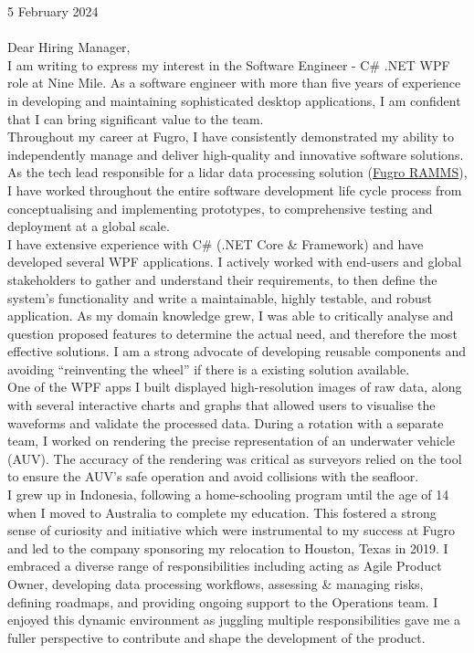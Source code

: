 \vspace{30pt}

5 February 2024 \\ \\

Dear Hiring Manager, \\

I am writing to express my interest in the Software Engineer - C\# .NET WPF role at Nine Mile. As a software engineer with more than five years of experience in developing and maintaining sophisticated desktop applications, I am confident that I can bring significant value to the team. \\

Throughout my career at Fugro, I have consistently demonstrated my ability to independently manage and deliver high-quality and innovative software solutions. As the tech lead responsible for a lidar data processing solution (\href{https://www.youtube.com/watch?v=f65bdm4tous}{\underline{Fugro RAMMS}}), I have worked throughout the entire software development life cycle process from conceptualising and implementing prototypes, to comprehensive testing and deployment at a global scale. \\

I have extensive experience with C\# (.NET Core \& Framework) and have developed several WPF applications. I actively worked with end-users and global stakeholders to gather and understand their requirements, to then define the system's functionality and write a maintainable, highly testable, and robust application. As my domain knowledge grew, I was able to critically analyse and question proposed features to determine the actual need, and therefore the most effective solutions. I am a strong advocate of developing reusable components and avoiding “reinventing the wheel” if there is a existing solution
available. \\

One of the WPF apps I built displayed high-resolution images of raw data, along with several interactive charts and graphs that allowed users to visualise the waveforms and validate the processed data. During a rotation with a separate team, I worked on rendering the precise representation of an underwater vehicle (AUV). The accuracy of the rendering was critical as surveyors relied on the tool to ensure the AUV's safe operation and avoid collisions with the seafloor. \\

I grew up in Indonesia, following a home-schooling program until the age of 14 when I moved to Australia to complete my education. This fostered a strong sense of curiosity and initiative which were instrumental to my success at Fugro and led to the company sponsoring my relocation to Houston, Texas in 2019. I embraced a diverse range of responsibilities including acting as Agile Product Owner, developing data processing workflows, assessing \& managing risks, defining roadmaps, and providing ongoing support to the Operations team. I enjoyed this dynamic environment as juggling multiple responsibilities gave me a fuller perspective to contribute and shape the development of the product. \\

